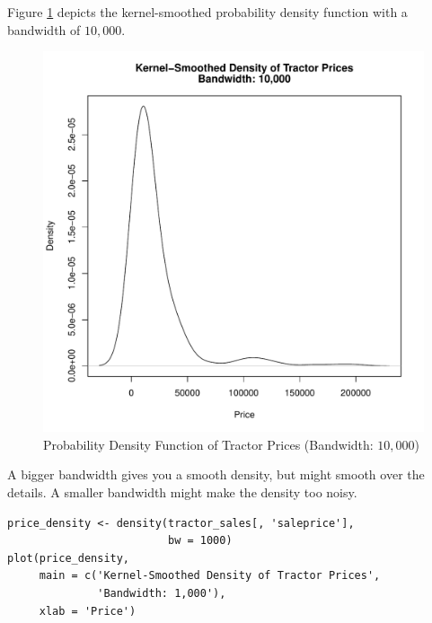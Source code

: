Figure \ref{fig:density_saleprice_bw10000} depicts
the kernel-smoothed probability density function
with a bandwidth of $10,000$.


\begin{figure}[h!]
  \centering
  \includegraphics[scale = 0.5, keepaspectratio=true]{../Figures/density_saleprice_bw10000}
  \caption{Probability Density Function of Tractor Prices (Bandwidth: $10,000$)} \label{fig:density_saleprice_bw10000}
\end{figure}

\pagebreak
A bigger bandwidth gives you a smooth density,
but might smooth over the details.
A smaller bandwidth might make the density too noisy.


\begin{verbatim}
price_density <- density(tractor_sales[, 'saleprice'],
                         bw = 1000)
plot(price_density,
     main = c('Kernel-Smoothed Density of Tractor Prices',
              'Bandwidth: 1,000'),
     xlab = 'Price')
\end{verbatim}


